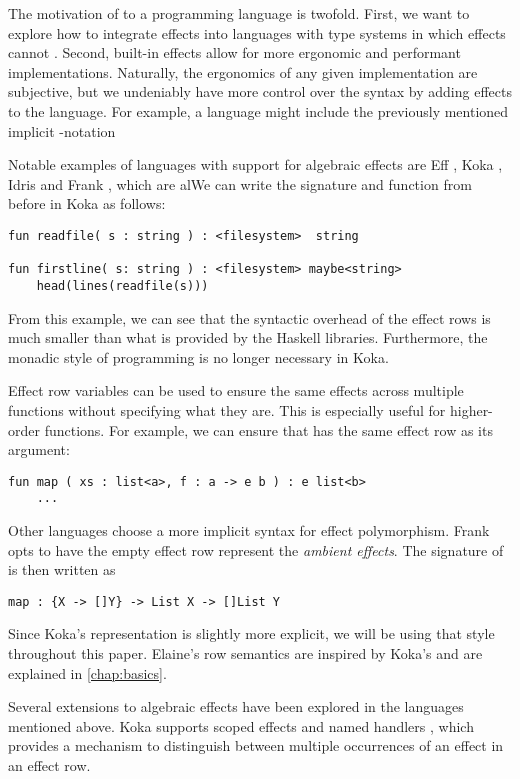 The motivation of  to a programming language is twofold. First, we want to explore how to integrate effects into languages with type systems in which effects cannot . Second, built-in effects allow for more ergonomic and performant implementations. Naturally, the ergonomics of any given implementation are subjective, but we undeniably have more control over the syntax by adding effects to the language. For example, a language might include the previously mentioned implicit -notation

Notable examples of languages with support for algebraic effects are Eff \autocite{bauer_programming_2015}, Koka \autocite{leijen_koka_2014}, Idris \autocite{brady_programming_2013} and Frank \autocite{lindley_be_2017}, which are alWe can write the  signature and  function from before in Koka as follows:
\begin{lstlisting}[language={},style=fancy]
fun readfile( s : string ) : <filesystem>  string

fun firstline( s: string ) : <filesystem> maybe<string>
    head(lines(readfile(s)))
\end{lstlisting}
From this example, we can see that the syntactic overhead of the effect rows is much smaller than what is provided by the Haskell libraries. Furthermore, the monadic style of programming is no longer necessary in Koka.

Effect row variables can be used to ensure the same effects across multiple functions without specifying what they are. This is especially useful for higher-order functions. For example, we can ensure that  has the same effect row as its argument:
\begin{lstlisting}[language={},style=fancy]
fun map ( xs : list<a>, f : a -> e b ) : e list<b>
    ...
\end{lstlisting}

Other languages choose a more implicit syntax for effect polymorphism. Frank \autocite{lindley_be_2017} opts to have the empty effect row represent the \emph{ambient effects}. The signature of  is then written as
\begin{lstlisting}[language={},style=fancy]
map : {X -> []Y} -> List X -> []List Y
\end{lstlisting}
Since Koka's representation is slightly more explicit, we will be using that style throughout this paper. Elaine's row semantics are inspired by Koka's and are explained in \cref{chap:basics}.

Several extensions to algebraic effects have been explored in the languages mentioned above. Koka supports scoped effects and named handlers \autocite{xie_first-class_2022}, which provides a mechanism to distinguish between multiple occurrences of an effect in an effect row.
